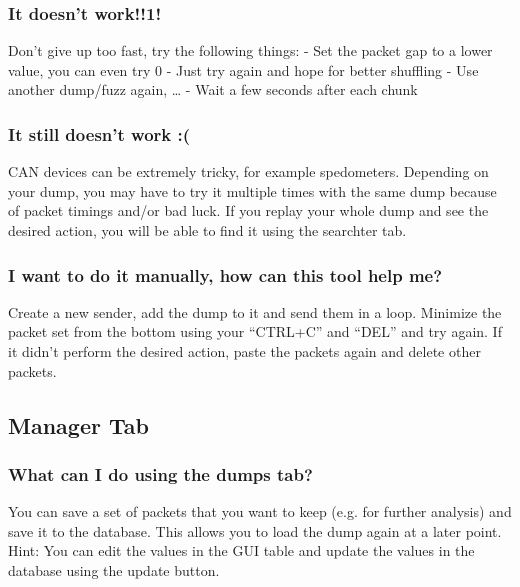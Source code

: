 \documentclass[letterpaper,10pt,english]{sphinxmanual}
\begin{document}
\subsubsection{It doesn’t work!!1!}
\label{\detokenize{manual.searchertab:it-doesn-t-work-1}}
Don’t give up too fast, try the following things:
- Set the packet gap to a lower value, you can even try 0
- Just try again and hope for better shuffling
- Use another dump/fuzz again, …
- Wait a few seconds after each chunk


\subsubsection{It still doesn’t work :(}
\label{\detokenize{manual.searchertab:it-still-doesn-t-work}}
CAN devices can be extremely tricky, for example spedometers. Depending
on your dump, you may have to try it multiple times with the same dump
because of packet timings and/or bad luck. If you replay your whole
dump and see the desired action, you will be able to find it using
the searchter tab.


\subsubsection{I want to do it manually, how can this tool help me?}
\label{\detokenize{manual.searchertab:i-want-to-do-it-manually-how-can-this-tool-help-me}}
Create a new sender, add the dump to it and send them in a loop.
Minimize the packet set from the bottom using your “CTRL+C” and “DEL” and try
again. If it didn’t perform the desired action, paste the packets again
and delete other packets.


\subsection{Manager Tab}
\label{\detokenize{manual.managertab:manager-tab}}\label{\detokenize{manual.managertab::doc}}

\subsubsection{What can I do using the dumps tab?}
\label{\detokenize{manual.managertab:what-can-i-do-using-the-dumps-tab}}
You can save a set of packets that you want to keep (e.g. for further
analysis) and save it to the database. This allows you to load the
dump again at a later point.
Hint: You can edit the values in the GUI table and update the values
in the database using the update button.
\end{document}
